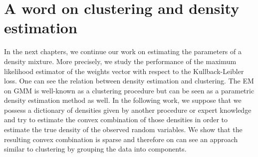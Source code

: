 \section{A word on clustering and density estimation}
In the next chapters, we continue our work on estimating the parameters of a density mixture. More precisely, we study the performance of the maximum likelihood estimator of the weights vector with respect to the Kullback-Leibler loss. One can see the relation between density estimation and clustering. The EM on GMM is well-known as a clustering procedure but can be seen as a parametric density estimation method as well. In the following work, we suppose that we possess a dictionary of densities given by another procedure or expert knowledge and try to estimate the convex combination of those densities in order to estimate the true density of the observed random variables. We show that the resulting convex combination is sparse and therefore on can see an approach similar to clustering by grouping the data into components.